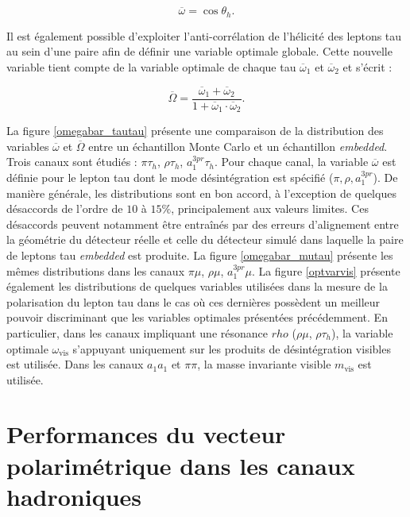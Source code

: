 $$\overline{\omega}=\cos\theta_h.$$

Il est également possible d'exploiter l'anti-corrélation de l'hélicité des leptons tau au sein d'une paire afin de définir une variable optimale globale. Cette nouvelle variable tient compte de la variable optimale de chaque tau $\overline{\omega}_1$ et $\overline{\omega}_2$ et s'écrit :

\begin{equation}
    \overline{\Omega}=\frac{\overline{\omega}_1+\overline{\omega}_2}{1+\overline{\omega}_1\cdot\overline{\omega}_2}.
\end{equation}

La figure \ref{omegabar_tautau} présente une comparaison de la distribution des variables $\overline{\omega}$ et $\overline{\Omega}$ entre un échantillon Monte Carlo et un échantillon \textit{embedded}. Trois canaux sont étudiés : $\pi\tau_h$, $\rho\tau_h$, $a_1^{3pr}\tau_h$. Pour chaque canal, la variable $\overline{\omega}$ est définie pour le lepton tau dont le mode désintégration est spécifié ($\pi,\rho,a_1^{3pr}$). De manière générale, les distributions sont en bon accord, à l'exception de quelques désaccords de l'ordre de $10$ à $15\%$, principalement aux valeurs limites. Ces désaccords peuvent notamment être entraînés par des erreurs d'alignement entre la géométrie du détecteur réelle et celle du détecteur simulé dans laquelle la paire de leptons tau \textit{embedded} est produite. La figure \ref{omegabar_mutau} présente les mêmes distributions dans les canaux $\pi\mu$, $\rho\mu$, $a_1^{3pr}\mu$. La figure \ref{optvarvis} présente également les distributions de quelques variables utilisées dans la mesure de la polarisation du lepton tau \cite{Zpol} dans le cas où ces dernières possèdent un meilleur pouvoir discriminant que les variables optimales présentées précédemment. En particulier, dans les canaux impliquant une résonance $rho$ ($\rho\mu$, $\rho\tau_h$), la variable optimale $\omega_{\text{vis}}$ s'appuyant uniquement sur les produits de désintégration visibles est utilisée. Dans les canaux $a_1a_1$ et $\pi\pi$, la masse invariante visible $m_{\text{vis}}$ est utilisée.
    
\section{Performances du vecteur polarimétrique dans les canaux hadroniques} 
\label{perf}


